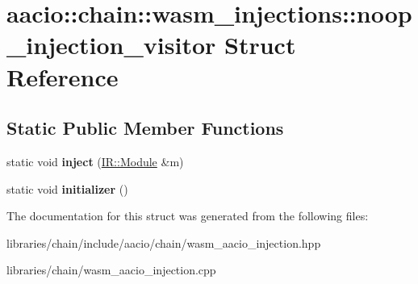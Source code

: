 \hypertarget{structaacio_1_1chain_1_1wasm__injections_1_1noop__injection__visitor}{}\section{aacio\+:\+:chain\+:\+:wasm\+\_\+injections\+:\+:noop\+\_\+injection\+\_\+visitor Struct Reference}
\label{structaacio_1_1chain_1_1wasm__injections_1_1noop__injection__visitor}
\subsection*{Static Public Member Functions}
\begin{DoxyCompactItemize}
\item 
\mbox{\label{structaacio_1_1chain_1_1wasm__injections_1_1noop__injection__visitor_aa13a4c333c3e7edef5b257fba53695df}} 
static void {\bfseries inject} (\mbox{\hyperlink{struct_i_r_1_1_module}{I\+R\+::\+Module}} \&m)
\item 
\mbox{\label{structaacio_1_1chain_1_1wasm__injections_1_1noop__injection__visitor_a28ed87582a53dcb1de0d0b9fff737679}} 
static void {\bfseries initializer} ()
\end{DoxyCompactItemize}


The documentation for this struct was generated from the following files\+:\begin{DoxyCompactItemize}
\item 
libraries/chain/include/aacio/chain/wasm\+\_\+aacio\+\_\+injection.\+hpp\item 
libraries/chain/wasm\+\_\+aacio\+\_\+injection.\+cpp\end{DoxyCompactItemize}
